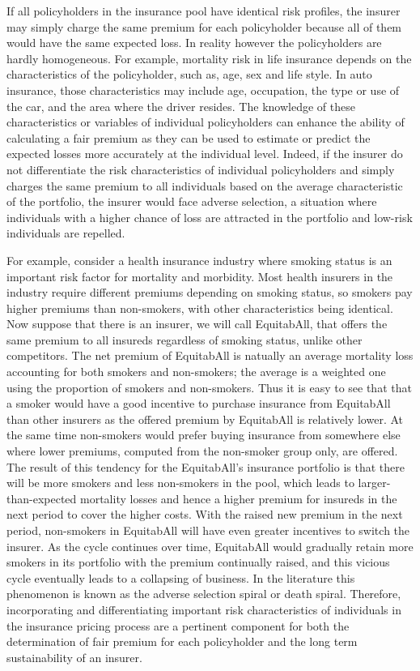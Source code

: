 \documentclass[]{book}
\theoremstyle{definition}
\theoremstyle{definition}
\theoremstyle{definition}
\theoremstyle{remark}
\begin{document}
If all policyholders in the insurance pool have identical risk profiles,
the insurer may simply charge the same premium for each policyholder
because all of them would have the same expected loss. In reality
however the policyholders are hardly homogeneous. For example, mortality
risk in life insurance depends on the characteristics of the
policyholder, such as, age, sex and life style. In auto insurance, those
characteristics may include age, occupation, the type or use of the car,
and the area where the driver resides. The knowledge of these
characteristics or variables of individual policyholders can enhance the
ability of calculating a fair premium as they can be used to estimate or
predict the expected losses more accurately at the individual level.
Indeed, if the insurer do not differentiate the risk characteristics of
individual policyholders and simply charges the same premium to all
individuals based on the average characteristic of the portfolio, the
insurer would face adverse selection, a situation where individuals with
a higher chance of loss are attracted in the portfolio and low-risk
individuals are repelled.

For example, consider a health insurance industry where smoking status
is an important risk factor for mortality and morbidity. Most health
insurers in the industry require different premiums depending on smoking
status, so smokers pay higher premiums than non-smokers, with other
characteristics being identical. Now suppose that there is an insurer,
we will call EquitabAll, that offers the same premium to all insureds
regardless of smoking status, unlike other competitors. The net premium
of EquitabAll is natually an average mortality loss accounting for both
smokers and non-smokers; the average is a weighted one using the
proportion of smokers and non-smokers. Thus it is easy to see that that
a smoker would have a good incentive to purchase insurance from
EquitabAll than other insurers as the offered premium by EquitabAll is
relatively lower. At the same time non-smokers would prefer buying
insurance from somewhere else where lower premiums, computed from the
non-smoker group only, are offered. The result of this tendency for the
EquitabAll's insurance portfolio is that there will be more smokers and
less non-smokers in the pool, which leads to larger-than-expected
mortality losses and hence a higher premium for insureds in the next
period to cover the higher costs. With the raised new premium in the
next period, non-smokers in EquitabAll will have even greater incentives
to switch the insurer. As the cycle continues over time, EquitabAll
would gradually retain more smokers in its portfolio with the premium
continually raised, and this vicious cycle eventually leads to a
collapsing of business. In the literature this phenomenon is known as
the adverse selection spiral or death spiral. Therefore, incorporating
and differentiating important risk characteristics of individuals in the
insurance pricing process are a pertinent component for both the
determination of fair premium for each policyholder and the long term
sustainability of an insurer.
\end{document}
